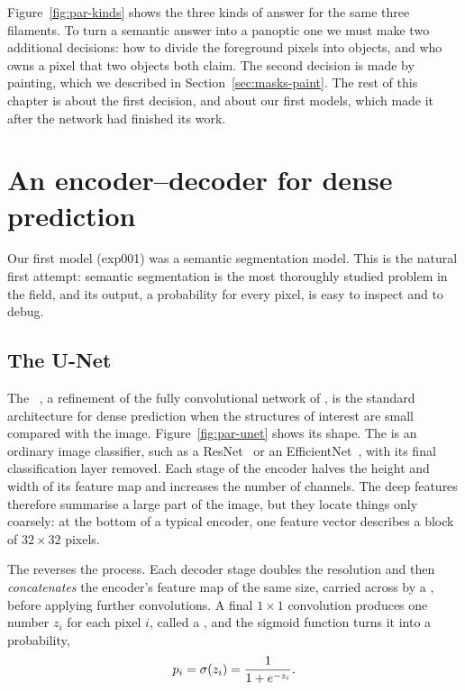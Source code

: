 Figure~\ref{fig:par-kinds} shows the three kinds of answer for the same three filaments. To turn a
semantic answer into a panoptic one we must make two additional decisions: how to divide the
foreground pixels into objects, and who owns a pixel that two objects both claim. The second
decision is made by painting, which we described in Section~\ref{sec:masks-paint}. The rest of this
chapter is about the first decision, and about our first models, which made it after the network
had finished its work.

\section{An encoder--decoder for dense prediction}\label{sec:paradigms-unet}
Our first model (exp001) was a semantic segmentation model. This is the natural first attempt:
semantic segmentation is the most thoroughly studied problem in the field, and its output, a
probability for every pixel, is easy to inspect and to debug.

\subsection{The U-Net}\label{sec:par-unet-arch}
The ~\citep{unet}, a refinement of the fully convolutional network
of \citet{long2015}, is the standard architecture for dense prediction when the structures of
interest are small compared with the image. Figure~\ref{fig:par-unet} shows its
shape. The  is an ordinary image classifier, such as a ResNet~\citep{resnet} or an
EfficientNet~\citep{efficientnet}, with its final classification layer removed. Each stage of the
encoder halves the height and width of its feature map and increases the number of channels. The
deep features therefore summarise a large part of the image, but they locate things only coarsely:
at the bottom of a typical encoder, one feature vector describes a block of $32\times32$ pixels.

The  reverses the process. Each decoder stage doubles the resolution and then
\emph{concatenates} the encoder's feature map of the same size, carried across by a
, before applying further convolutions. A final $1\times1$ convolution
produces one number $z_i$ for each pixel $i$, called a , and the sigmoid function
turns it into a probability,
\begin{equation}
p_i = \sigma(z_i) = \frac{1}{1+e^{-z_i}}.
\end{equation}

